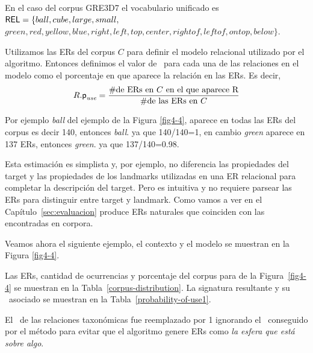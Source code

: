 En el caso del corpus GRE3D7 el vocabulario unificado es 
$\textsf{REL} = \{ball, cube, large, small,$\\
$green, red, yellow, blue, right, left, top, center, rightof, leftof, ontop,
below\} $.

 Utilizamos las ERs del corpus $C$
para definir el modelo relacional utilizado por el algoritmo. Entonces 
definimos el valor de \puse\ para cada una de las relaciones en el modelo como el
porcentaje en que aparece la relaci\'on en las ERs. Es decir,
\begin{equation} \label{eq1}
R.\textsf{p}_\textit{use} = \frac {\#\mbox{de ERs en $C$ en el que aparece R}} {\#\mbox{de las ERs en $C$}}
\end{equation}

Por ejemplo {\it ball} del ejemplo de la Figura \ref{fig4-4}, aparece en todas las ERs del corpus es decir 140, entonces {\it ball}. ya que 140/140=1, en cambio {\it green} aparece en 137 ERs, entonces {\it green}. ya que 137/140=0.98.

Esta estimaci\'on es simplista y, por ejemplo, no 
diferencia las propiedades del target y las propiedades de
los landmarks utilizadas en una ER relacional para completar la descripci\'on
del target. Pero es intuitiva y no requiere parsear las ERs para distinguir entre target y landmark. Como vamos a ver
en el Cap\'itulo~\ref{sec:evaluacion} produce ERs naturales
que coinciden con las encontradas en corpora.

Veamos ahora el siguiente ejemplo, el contexto y el modelo se muestran en la Figura \ref{fig4-4}.


Las ERs, cantidad de ocurrencias y porcentaje del corpus para de la Figura~\ref{fig4-4} se muestran en la Tabla~\ref{corpus-distribution}. La signatura resultante y su \puse\ asociado se muestran en la Tabla~\ref{probability-of-use1}.

El \puse\ de las relaciones taxon\'omicas fue reemplazado por 1 ignorando el \puse\ conseguido por el m\'etodo para evitar que el algoritmo genere ERs como {\it la esfera que est\'a sobre algo}.

